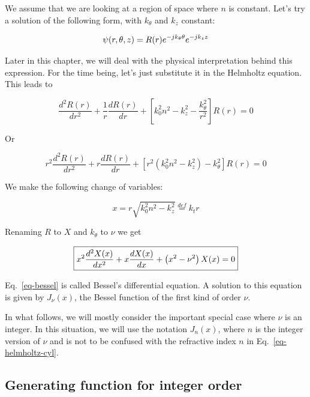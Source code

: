 We assume that we are looking at a region of space where $n$ is constant. Let's try a solution of the following form, with $k_\theta$ and $k_z$ constant: 

\begin{equation}
\psi(r,\theta,z) = R(r)e^{-j k_\theta \theta }e^{-j k_z z} \\
\end{equation}  

Later in this chapter, we will deal with the physical interpretation behind this expression. For the time being, let's just substitute it in the Helmholtz equation. This leads to

\begin{equation}
\frac{d^2 R(r)}{d r^2} + \frac{1}{r} \frac{d R(r)}{d r} + \left[k_0^2 n^2 - k_z^2 - \frac{k_\theta^2}{r^2} \right] R(r) = 0
\end{equation} 

Or

\begin{equation}
r^2\frac{d^2 R(r)}{d r^2} + r \frac{d R(r)}{d r} + \left[ r^2 (k_0^2 n^2 - k_z^2)- k_\theta^2 \right] R(r) = 0
\end{equation}

We make the following change of variables:

\begin{equation}
x = r \sqrt{k_0^2 n^2 - k_z^2} \stackrel{def}{=} k_t r
\end{equation}

Renaming $R$ to $X$ and $k_\theta$ to $\nu$ we get

\begin{equation}
\fbox{$\displaystyle
x^2\frac{d^2 X(x)}{d x^2} + x \frac{d X(x)}{d x} + \left(x ^ 2 - \nu^2 \right)X(x) = 0 \label{eq-bessel}
$}
\end{equation}

Eq.~\ref{eq-bessel} is called Bessel's differential equation. A solution to this equation is given by $J_\nu(x)$, the Bessel function of the first kind of order $\nu$.

In what follows, we will mostly consider the important special case where $\nu$ is an integer. In this situation, we will use the notation $J_n(x)$, where $n$ is the integer version of $\nu$ and is not to be confused with the refractive index $n$ in Eq.~\ref{eq-helmholtz-cyl}.

\subsection{Generating function for integer order}

